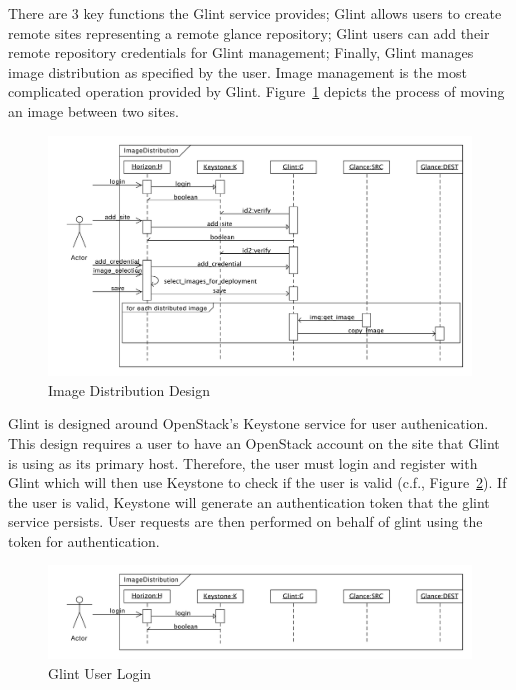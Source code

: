\documentclass[a4paper]{jpconf}
\begin{document}
There are 3 key functions the Glint service provides; Glint allows users to create remote sites representing a remote glance repository; Glint users can add their remote repository credentials for Glint management; Finally, Glint manages image distribution as specified by the user. Image management is the most complicated operation provided by Glint. Figure~\ref{fig:glintseqdiag} depicts the process of moving an image between two sites. 

\begin{figure}[H]
\begin{center}
\includegraphics[width=36pc]{images/glintseqdiag.pdf}
\caption{\label{fig:glintseqdiag}Image Distribution Design}
\end{center}
\end{figure}

Glint is designed around OpenStack's Keystone service for user authenication. This design requires a user to have an OpenStack account on the site that Glint is using as its primary host. Therefore, the user must login and register with Glint which will then use Keystone to check if the user is valid (c.f., Figure~\ref{fig:glintlogin}). If the user is valid, Keystone will generate an authentication token that the glint service persists. User requests are then performed on behalf of glint using the token for authentication.

\begin{figure}[H]
\begin{center}
\includegraphics[width=36pc]{images/glintlogin.pdf}
\caption{\label{fig:glintlogin}Glint User Login}
\end{center}
\end{figure}
\end{document}
